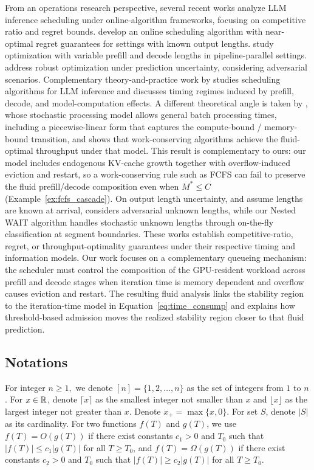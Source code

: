 From an operations research perspective, several recent works analyze LLM inference scheduling under online-algorithm frameworks, focusing on competitive ratio and regret bounds. \cite{jaillet2025onlineschedulingllminference} develop an online scheduling algorithm with near-optimal regret guarantees for settings with known output lengths. \cite{wang2025llm} study optimization with variable prefill and decode lengths in pipeline-parallel settings. \cite{chen2025adaptively} address robust optimization under prediction uncertainty, considering adversarial scenarios. Complementary theory-and-practice work by \cite{bari2025optimal} studies scheduling algorithms for LLM inference and discusses timing regimes induced by prefill, decode, and model-computation effects. A different theoretical angle is taken by \cite{li2025throughput}, whose stochastic processing model allows general batch processing times, including a piecewise-linear form that captures the compute-bound / memory-bound transition, and shows that work-conserving algorithms achieve the fluid-optimal throughput under that model. This result is complementary to ours: our model includes endogenous KV-cache growth together with overflow-induced eviction and restart, so a work-conserving rule such as FCFS can fail to preserve the fluid prefill/decode composition even when \(M^*\le C\) (Example~\ref{ex:fcfs_cascade}). On output length uncertainty, \cite{jaillet2025onlineschedulingllminference} and \cite{wang2025llm} assume lengths are known at arrival, \cite{chen2025adaptively} considers adversarial unknown lengths, while our Nested WAIT algorithm handles stochastic unknown lengths through on-the-fly classification at segment boundaries. These works establish competitive-ratio, regret, or throughput-optimality guarantees under their respective timing and information models. Our work focuses on a complementary queueing mechanism: the scheduler must control the composition of the GPU-resident workload across prefill and decode stages when iteration time is memory dependent and overflow causes eviction and restart. The resulting fluid analysis links the stability region to the iteration-time model in Equation~\eqref{eq:time_consump} and explains how threshold-based admission moves the realized stability region closer to that fluid prediction.


\subsection{Notations}
For integer $n\ge 1,$ we denote $[n]=\{1,2,\dots,n\}$ as the set of integers from $1$ to $n$. For $x\in\mathbb{R}$, denote $\lceil x\rceil$ as the smallest integer not smaller than $x$ and $\lfloor x\rfloor$ as the largest integer not greater than $x$. Denote $x_+=\max\{x, 0\}$. For set $S$, denote $|S|$ as its cardinality. For two functions $f(T)$ and $g(T)$, we use $f(T)=O(g(T))$ if there exist constants $c_1>0$ and $T_0$ such that \(|f(T)|\le c_1|g(T)|\) for all \(T\ge T_0\), and \(f(T)=\Omega(g(T))\) if there exist constants $c_2>0$ and $T_0$ such that \(|f(T)|\ge c_2|g(T)|\) for all \(T\ge T_0\). 
